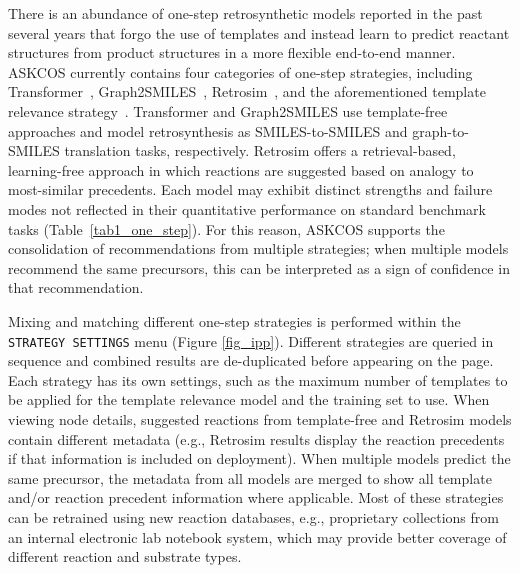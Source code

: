 \documentclass[pdflatex,sn-mathphys-num]{sn-jnl}%
\theoremstyle{thmstyleone}%
\theoremstyle{thmstyletwo}%
\theoremstyle{thmstylethree}%
\begin{document}
There is an abundance of one-step retrosynthetic models reported in the past several years that forgo the use of templates and instead learn to predict reactant structures from product structures in a more flexible end-to-end manner. ASKCOS currently contains four categories of one-step strategies, including Transformer~\citep{lin_automatic_2020,tetko_state---art_2020,schwaller_molecular_2019}, Graph2SMILES~\citep{tu_permutation_2022}, Retrosim~\citep{coley_computer-assisted_2017}, and the aforementioned template relevance strategy~\citep{segler_neural-symbolic_2017}. Transformer and Graph2SMILES use template-free approaches and model retrosynthesis as SMILES-to-SMILES and graph-to-SMILES translation tasks, respectively. Retrosim offers a retrieval-based, learning-free approach in which reactions are suggested based on analogy to most-similar precedents. Each model may exhibit distinct strengths and failure modes not reflected in their quantitative performance on standard benchmark tasks (Table~\ref{tab1_one_step}). For this reason, ASKCOS supports the consolidation of recommendations from multiple strategies; when multiple models recommend the same precursors, this can be interpreted as a sign of confidence in that recommendation.


Mixing and matching different one-step strategies is performed within the \texttt{STRATEGY SETTINGS} menu (Figure \ref{fig_ipp}). Different strategies are queried in sequence and combined results are de-duplicated before appearing on the page. Each strategy has its own settings, such as the maximum number of templates to be applied for the template relevance model and the training set to use. When viewing node details, suggested reactions from template-free and Retrosim models contain different metadata (e.g., Retrosim results display the reaction precedents if that information is included on deployment). When multiple models predict the same precursor, the metadata from all models are merged to show all template and/or reaction precedent information where applicable. Most of these strategies can be retrained using new reaction databases, e.g., proprietary collections from an internal electronic lab notebook system, which may provide better coverage of different reaction and substrate types.
\end{document}
